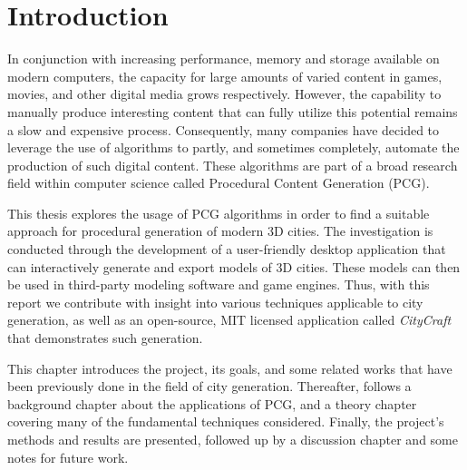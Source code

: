 \chapter{Introduction}


In conjunction with increasing performance, memory and storage available on modern computers, the capacity for large amounts of varied content in games, movies, and other digital media grows respectively.
However, the capability to manually produce interesting content that can fully utilize this potential remains a slow and expensive process.
Consequently, many companies have decided to leverage the use of algorithms to partly, and sometimes completely, automate the production of such digital content.
These algorithms are part of a broad research field within computer science called Procedural Content Generation (PCG).

This thesis explores the usage of PCG algorithms in order to find a suitable approach for procedural generation of modern 3D cities.
The investigation is conducted through the development of a user-friendly desktop application that can interactively generate and export models of 3D cities.
These models can then be used in third-party modeling software and game engines.
Thus, with this report we contribute with insight into various techniques applicable to city generation, as well as an open-source, MIT licensed application called \textit{CityCraft} that demonstrates such generation.

This chapter introduces the project, its goals, and some related works that have been previously done in the field of city generation.
Thereafter, follows a background chapter about the applications of PCG, and a theory chapter covering many of the fundamental techniques considered.
Finally, the project's methods and results are presented, followed up by a discussion chapter and some notes for future work.

\newpage




